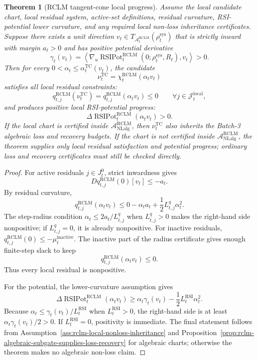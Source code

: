 \documentclass[11pt,a4paper]{article}
\newtheorem{theorem}{Theorem}[section]
\newcommand{\Acal}{\mathcal A}
\newcommand{\RCLM}{\mathrm{RCLM}}
\newcommand{\RSI}{\mathrm{RSI}}
\newcommand{\sys}{\mathrm{sys}}
\newcommand{\local}{\mathrm{local}}
\newcommand{\NLalg}{\mathrm{NLalg}}
\newcommand{\TC}{\mathrm{TC}}
\newcommand{\RSIPot}{\operatorname{RSIPot}}
\begin{document}
\begin{theorem}[RCLM tangent-cone local progress]
\label{thm:rclm-tangent-cone-local-progress}
Assume the local candidate chart, local residual system, active-set definitions, residual curvature, RSI-potential lower curvature, and any required local non-loss inheritance certificates.  Suppose there exists a unit direction \(v_t\in T_{\Acal_t^{\RCLM}}(\rho_t^{\sys})\) that is strictly inward with margin \(a_t>0\) and has positive potential derivative
\[
\gamma_t(v_t)=\left\langle\nabla_u\RSIPot_t^{\RCLM}(0;\rho_t^{\sys},R_t),v_t\right\rangle>0.
\]
Then for every \(0<\alpha_t\le\alpha_t^{\TC}(v_t)\), the candidate
\[
\nu_t^{\TC}=\chi_t^{\RCLM}(\alpha_t v_t)
\]
satisfies all local residual constraints:
\[
q_{t,j}^{\RCLM}(\nu_t^{\TC})
=q_{t,j}^{\RCLM}(\alpha_t v_t)
\le0
\qquad\forall j\in\mathcal J_t^{\local},
\]
and produces positive local RSI-potential progress:
\[
\Delta\RSIPot_t^{\RCLM}(\alpha_t v_t)>0.
\]
If the local chart is certified inside \(\Acal_{\NLalg}^{\RCLM}\), then \(\nu_t^{\TC}\) also inherits the Batch-3 algebraic loss and recovery budgets.  If the chart is not certified inside \(\Acal_{\NLalg}^{\RCLM}\), the theorem supplies only local residual satisfaction and potential progress; ordinary loss and recovery certificates must still be checked directly.
\end{theorem}

\begin{proof}
For active residuals \(j\in J_t^0\), strict inwardness gives
\[
Dq_{t,j}^{\RCLM}(0)[v_t]\le -a_t.
\]
By residual curvature,
\[
q_{t,j}^{\RCLM}(\alpha_t v_t)
\le
0-\alpha_t a_t+\frac12L_{t,j}^q\alpha_t^2.
\]
The step-radius condition \(\alpha_t\le 2a_t/L_{t,j}^q\) when \(L_{t,j}^q>0\) makes the right-hand side nonpositive; if \(L_{t,j}^q=0\), it is already nonpositive.  For inactive residuals, \(q_{t,j}^{\RCLM}(0)\le-\mu_t^{\mathrm{inactive}}\).  The inactive part of the radius certificate gives enough finite-step slack to keep
\[
q_{t,j}^{\RCLM}(\alpha_t v_t)\le0.
\]
Thus every local residual is nonpositive.

For the potential, the lower-curvature assumption gives
\[
\Delta\RSIPot_t^{\RCLM}(\alpha_t v_t)
\ge
\alpha_t\gamma_t(v_t)-\frac12L_t^{\RSI}\alpha_t^2.
\]
Because \(\alpha_t\le\gamma_t(v_t)/L_t^{\RSI}\) when \(L_t^{\RSI}>0\), the right-hand side is at least \(\alpha_t\gamma_t(v_t)/2>0\).  If \(L_t^{\RSI}=0\), positivity is immediate.  The final statement follows from Assumption~\ref{ass:rclm-local-nonloss-inheritance} and Proposition~\ref{prop:rclm-algebraic-subgate-supplies-loss-recovery} for algebraic charts; otherwise the theorem makes no algebraic non-loss claim.
\end{proof}
\end{document}
